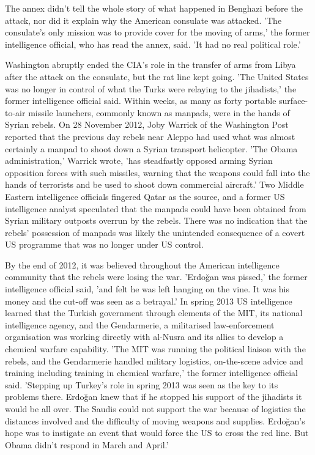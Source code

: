 The annex didn't tell the whole story of what happened in Benghazi
before the attack, nor did it explain why the American consulate was
attacked. 'The consulate's only mission was to provide cover for the
moving of arms,' the former intelligence official, who has read the
annex, said. 'It had no real political role.'

Washington abruptly ended the CIA's role in the transfer of arms from
Libya after the attack on the consulate, but the rat line kept going.
'The United States was no longer in control of what the Turks were
relaying to the jihadists,' the former intelligence official said.
Within weeks, as many as forty portable surface-to-air missile launchers,
commonly known as manpads, were in the hands of Syrian rebels. On
28 November 2012, Joby Warrick of the Washington Post reported that
the previous day rebels near Aleppo had used what was almost certainly
a manpad to shoot down a Syrian transport helicopter. 'The Obama administration,'
Warrick wrote, 'has steadfastly opposed arming Syrian opposition forces
with such missiles, warning that the weapons could fall into the hands
of terrorists and be used to shoot down commercial aircraft.' Two
Middle Eastern intelligence officials fingered Qatar as the source,
and a former US intelligence analyst speculated that the manpads could
have been obtained from Syrian military outposts overrun by the rebels.
There was no indication that the rebels' possession of manpads was
likely the unintended consequence of a covert US programme that was
no longer under US control.

By the end of 2012, it was believed throughout the American intelligence
community that the rebels were losing the war. 'Erdo\u{g}an was pissed,'
the former intelligence official said, 'and felt he was left hanging
on the vine. It was his money and the cut-off was seen as a betrayal.'
In spring 2013 US intelligence learned that the Turkish government
\textendash{} through elements of the MIT, its national intelligence
agency, and the Gendarmerie, a militarised law-enforcement organisation
\textendash{} was working directly with al-Nusra and its allies to
develop a chemical warfare capability. 'The MIT was running the political
liaison with the rebels, and the Gendarmerie handled military logistics,
on-the-scene advice and training \textendash{} including training
in chemical warfare,' the former intelligence official said. 'Stepping
up Turkey's role in spring 2013 was seen as the key to its problems
there. Erdo\u{g}an knew that if he stopped his support of the jihadists
it would be all over. The Saudis could not support the war because
of logistics \textendash{} the distances involved and the difficulty
of moving weapons and supplies. Erdo\u{g}an's hope was to instigate
an event that would force the US to cross the red line. But Obama
didn't respond in March and April.'

